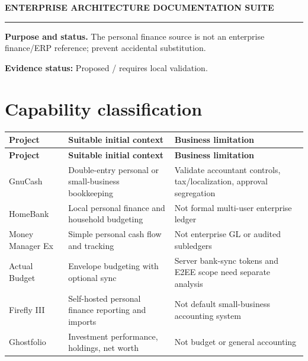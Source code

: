 \documentclass[10pt,letterpaper]{article}
\begin{document}
\begin{center}
{\large\bfseries\color{teal} ENTERPRISE ARCHITECTURE DOCUMENTATION SUITE}\par
{}\par
{}\par
\end{center}
\vspace{8pt}\hrule\vspace{12pt}
\textbf{Purpose and status.} The personal finance source is not an enterprise finance/ERP reference; prevent accidental substitution.\par
\textbf{Evidence status:} Proposed / requires local validation.\par
\section{Capability classification}
\small\begin{longtable}{>{\raggedright\arraybackslash}p{}>{\raggedright\arraybackslash}p{}>{\raggedright\arraybackslash}p{}}
\toprule
\textbf{Project} & \textbf{Suitable initial context} & \textbf{Business limitation}\\
\midrule\endfirsthead
\toprule
\textbf{Project} & \textbf{Suitable initial context} & \textbf{Business limitation}\\
\midrule\endhead
GnuCash & Double-entry personal or small-business bookkeeping & Validate accountant controls, tax/localization, approval segregation\\
HomeBank & Local personal finance and household budgeting & Not formal multi-user enterprise ledger\\
Money Manager Ex & Simple personal cash flow and tracking & Not enterprise GL or audited subledgers\\
Actual Budget & Envelope budgeting with optional sync & Server bank-sync tokens and E2EE scope need separate analysis\\
Firefly III & Self-hosted personal finance reporting and imports & Not default small-business accounting system\\
Ghostfolio & Investment performance, holdings, net worth & Not budget or general accounting\\
\bottomrule
\end{longtable}
\normalsize
\end{document}
